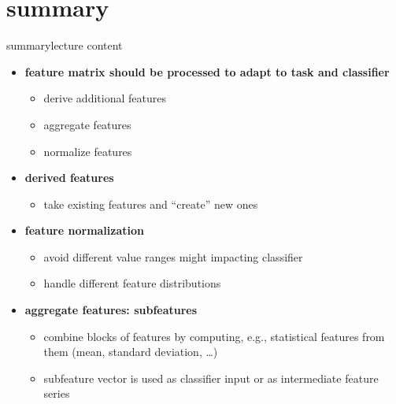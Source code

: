     \section{summary}
        \begin{frame}{summary}{lecture content}
            \begin{itemize}
                \item   \textbf{feature matrix should be processed to adapt to task and classifier}
                    \begin{itemize}
                        \item   derive additional features
                        \item   aggregate features
                        \item   normalize features
                    \end{itemize}
                \bigskip
                \item   \textbf{derived features}
                    \begin{itemize}
                        \item   take existing features and ``create'' new ones
                    \end{itemize}
                \bigskip
                \item   \textbf{feature normalization}
                    \begin{itemize}
                        \item   avoid different value ranges might impacting classifier
                        \item   handle different feature distributions
                    \end{itemize}
                \bigskip
                \item   \textbf{aggregate features: subfeatures}
                    \begin{itemize}
                        \item   combine blocks of features by computing, e.g., statistical features from them (mean, standard deviation, \ldots)
                        \item   subfeature vector is used as classifier input or as intermediate feature series
                    \end{itemize}
            \end{itemize}
        \end{frame}

